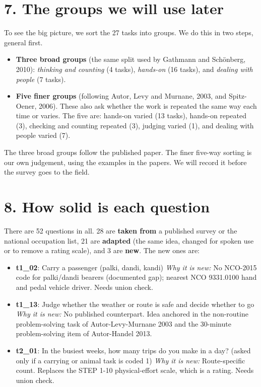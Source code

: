 \documentclass[11pt]{article}
\begin{document}
\section*{7. The groups we will use later}
To see the big picture, we sort the 27 tasks into groups. We do this in two steps, general first.
\begin{itemize}[leftmargin=1.2em,itemsep=2pt]
\item \textbf{Three broad groups} (the same split used by Gathmann and Sch\"onberg, 2010): \emph{thinking and counting} (4 tasks), \emph{hands-on} (16 tasks), and \emph{dealing with people} (7 tasks).
\item \textbf{Five finer groups} (following Autor, Levy and Murnane, 2003, and Spitz-Oener, 2006). These also ask whether the work is repeated the same way each time or varies. The five are: hands-on varied (13 tasks), hands-on repeated (3), checking and counting repeated (3), judging varied (1), and dealing with people varied (7).
\end{itemize}
The three broad groups follow the published paper. The finer five-way sorting is our own judgement,
using the examples in the papers. We will record it before the survey goes to the field.

\section*{8. How solid is each question}
There are 52 questions in all. 28 are \textbf{taken from} a published survey or the national occupation list,
21 are \textbf{adapted} (the same idea, changed for spoken use or to remove a rating scale),
and 3 are \textbf{new}. The new ones are:
\begin{itemize}[leftmargin=1.2em,itemsep=2pt]
\item \textbf{t1\_02}: Carry a passenger (palki, dandi, kandi) \textit{Why it is new:} No NCO-2015 code for palki/dandi bearers (documented gap); nearest NCO 9331.0100 hand and pedal vehicle driver. Needs union check.
\item \textbf{t1\_13}: Judge whether the weather or route is safe and decide whether to go \textit{Why it is new:} No published counterpart. Idea anchored in the non-routine problem-solving task of Autor-Levy-Murnane 2003 and the 30-minute problem-solving item of Autor-Handel 2013.
\item \textbf{t2\_01}: In the busiest weeks, how many trips do you make in a day? (asked only if a carrying or animal task is coded 1) \textit{Why it is new:} Route-specific count. Replaces the STEP 1-10 physical-effort scale, which is a rating. Needs union check.
\end{itemize}
\end{document}
